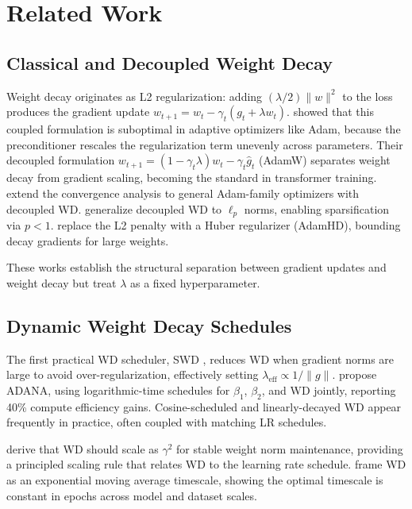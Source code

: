 \documentclass{article}
\begin{document}
\section{Related Work}
\label{sec:related}

\subsection{Classical and Decoupled Weight Decay}

Weight decay originates as L2 regularization: adding $(\lambda/2)\|w\|^2$ to the loss produces the gradient update $w_{t+1} = w_t - \gamma_t(g_t + \lambda w_t)$. \citet{loshchilov2019decoupled} showed that this coupled formulation is suboptimal in adaptive optimizers like Adam, because the preconditioner rescales the regularization term unevenly across parameters. Their decoupled formulation $w_{t+1} = (1-\gamma_t\lambda)w_t - \gamma_t\hat{g}_t$ (AdamW) separates weight decay from gradient scaling, becoming the standard in transformer training. \citet{ding2023convergence} extend the convergence analysis to general Adam-family optimizers with decoupled WD. \citet{outmezguine2024generalized} generalize decoupled WD to $\ell_p$ norms, enabling sparsification via $p < 1$. \citet{guo2025adamhd} replace the L2 penalty with a Huber regularizer (AdamHD), bounding decay gradients for large weights.

These works establish the structural separation between gradient updates and weight decay but treat $\lambda$ as a fixed hyperparameter.

\subsection{Dynamic Weight Decay Schedules}

The first practical WD scheduler, SWD \citep{xie2023swd}, reduces WD when gradient norms are large to avoid over-regularization, effectively setting $\lambda_{\text{eff}} \propto 1/\|g\|$. \citet{ferbach2026adana} propose ADANA, using logarithmic-time schedules for $\beta_1$, $\beta_2$, and WD jointly, reporting 40\% compute efficiency gains. Cosine-scheduled and linearly-decayed WD appear frequently in practice, often coupled with matching LR schedules.

\citet{chou2025wd_scaling} derive that WD should scale as $\gamma^2$ for stable weight norm maintenance, providing a principled scaling rule that relates WD to the learning rate schedule. \citet{wang2024wd_ema} frame WD as an exponential moving average timescale, showing the optimal timescale is constant in epochs across model and dataset scales.
\end{document}
